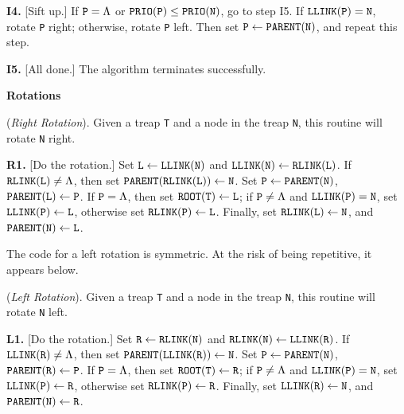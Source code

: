 \item{\bf I4.} [Sift up.]
If ${\tt P} = \Lambda$ or ${\tt PRIO(P)} \leq {\tt PRIO(N)}$, go to step I5.
If ${\tt LLINK(P)} = {\tt N}$, rotate {\tt P} right; otherwise,
rotate {\tt P} left. Then set ${\tt P} \gets {\tt PARENT(N)}$, and repeat this
step.

\item{\bf I5.} [All done.] The algorithm terminates successfully.

\medskip
\parindent=0pt
{\bf Rotations}

 ({\it Right Rotation}).
Given a treap {\tt T} and a node in the treap {\tt N}, this routine will rotate
{\tt N} right.

\parindent=36pt
\item{\bf R1.} [Do the rotation.]
Set
${\tt L} \gets {\tt LLINK(N)}$ and
${\tt LLINK(N)} \gets {\tt RLINK(L)}$.
If ${\tt RLINK(L)} \neq \Lambda$,
then set ${\tt PARENT(RLINK(L))} \gets {\tt N}$.
Set ${\tt P} \gets {\tt PARENT(N)}$, ${\tt PARENT(L)} \gets {\tt P}$.
If ${\tt P} = \Lambda$, then set ${\tt ROOT(T)} \gets {\tt L}$;
if ${\tt P} \neq \Lambda$ and ${\tt LLINK(P)} = {\tt N}$,
set ${\tt LLINK(P)} \gets {\tt L}$, otherwise
set ${\tt RLINK(P)} \gets {\tt L}$.
Finally, set ${\tt RLINK(L)} \gets {\tt N}$,
and ${\tt PARENT(N)} \gets {\tt L}$.

\parindent=0pt

\medskip
The code for a left rotation is symmetric. At the risk of being repetitive, it
appears below.
\medskip

 ({\it Left Rotation}).
Given a treap {\tt T} and a node in the treap {\tt N}, this routine will rotate
{\tt N} left.

\parindent=36pt
\item{\bf L1.} [Do the rotation.]
Set
${\tt R} \gets {\tt RLINK(N)}$ and
${\tt RLINK(N)} \gets {\tt LLINK(R)}$.
If ${\tt LLINK(R)} \neq \Lambda$,
then set ${\tt PARENT(LLINK(R))} \gets {\tt N}$.
Set ${\tt P} \gets {\tt PARENT(N)}$, ${\tt PARENT(R)} \gets {\tt P}$.
If ${\tt P} = \Lambda$, then set ${\tt ROOT(T)} \gets {\tt R}$;
if ${\tt P} \neq \Lambda$ and ${\tt LLINK(P)} = {\tt N}$,
set ${\tt LLINK(P)} \gets {\tt R}$, otherwise
set ${\tt RLINK(P)} \gets {\tt R}$.
Finally, set ${\tt LLINK(R)} \gets {\tt N}$,
and ${\tt PARENT(N)} \gets {\tt R}$.

\parindent=0pt

\bye
